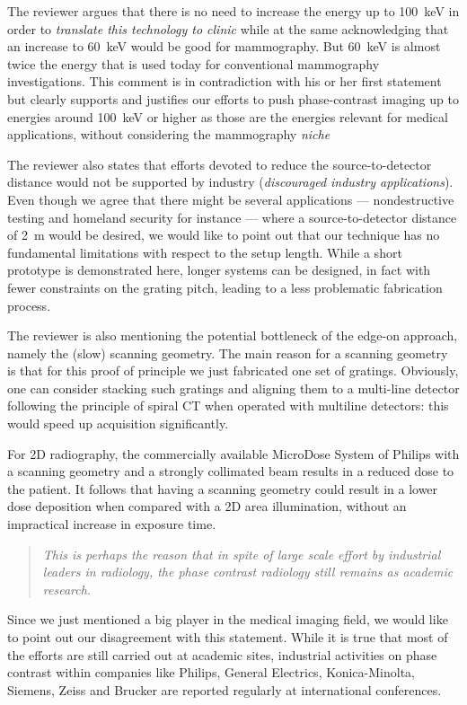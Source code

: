 \documentclass[a4paper,english]{scrartcl}
\newcommand{\reviewer}[1]{\emph{#1}}
\newenvironment{reviewerquote}{\begin{quote}\itshape}{\end{quote}}
\begin{document}
The reviewer argues that
there is no need to increase the energy up to \SI{100}{\kilo\eV} in order to
\reviewer{translate
this technology to clinic} while at the same acknowledging that 
an increase to \SI{60}{\kilo\eV} would be good for mammography. But
\SI{60}{\kilo\eV} is almost twice
the energy that is used today for conventional mammography
investigations. This comment is in contradiction with his or her first
statement but clearly supports and justifies our efforts to push phase-contrast
imaging up to energies around \SI{100}{\kilo\eV} or higher as those are the energies
relevant for medical applications, without considering the mammography
\emph{niche}

 The reviewer also states that efforts devoted to reduce the
 source-to-detector distance would not be supported by industry
 (\reviewer{discouraged industry applications}). Even though we agree that there
 might be several applications --- nondestructive testing and homeland
 security for instance --- where a source-to-detector distance of
 \SI{2}{\metre} would be
 desired, we would like to point out that our technique has no fundamental
 limitations with respect to the setup length. While a short prototype is
 demonstrated here, longer systems can be designed, in fact with fewer
 constraints on the grating pitch, leading to a less problematic fabrication
 process.

 The reviewer is also mentioning the potential bottleneck
 of the edge-on approach, namely the 
 (slow) scanning geometry. The
 main reason for a scanning geometry is that for this proof of principle we just fabricated one set of
 gratings. Obviously, one can consider stacking such gratings and aligning
 them to a multi-line detector following the  principle of spiral CT when
 operated with multiline detectors: this would speed up acquisition
 significantly.
 
 For 2D radiography, the commercially available MicroDose System of
 Philips with a scanning geometry and a strongly collimated beam 
 results in a reduced dose to the patient. It follows that having a scanning
 geometry could result in a lower dose deposition when compared with a 2D
 area illumination, without an impractical increase in exposure time.

 \begin{reviewerquote}
     This is perhaps the reason that in spite of large
     scale effort by industrial leaders in radiology, the phase contrast
     radiology still remains as academic research.
 \end{reviewerquote}
 Since we just mentioned a big player in the medical imaging field, we
 would like to point out our disagreement with this statement. While it is
 true that most of the efforts are still carried out at academic sites,
 industrial activities on phase contrast within companies like Philips,
 General Electrics, Konica-Minolta, Siemens, Zeiss and Brucker are reported
 regularly at international conferences.
\end{document}
